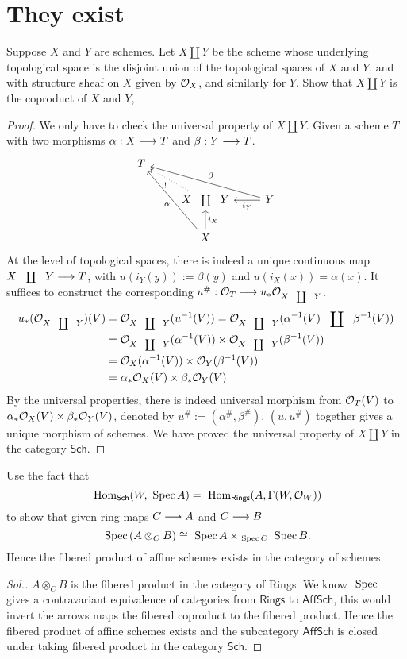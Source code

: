 \documentclass[11pt]{book} %
\begin{document}
\section{They exist}
\begin{exr}
Suppose $X$ and $Y$ are schemes. Let $X\coprod Y$ be the scheme whose underlying topological space is the disjoint union of the topological spaces of $X$ and $Y$, and with structure sheaf on $X$ given by ${\cal O}_X$, and similarly for $Y$. Show that $X\coprod Y$ is the coproduct of $X$ and $Y$,
\end{exr}
\begin{proof}
We only have to check the universal property of $X\coprod Y$.
 Given a scheme $T$ with two morphisms $\alpha: X\longrightarrow T$ and $\beta: Y\longrightarrow T$.
 $$
\begin{tikzcd}
T &  &  \\
 & X\coprod Y \arrow[lu, "!", dotted] & Y \arrow[l, "i_Y"] \arrow[llu, "\beta"'] \\
 & X \arrow[u, "i_X"'] \arrow[luu, "\alpha"] & 
\end{tikzcd}
 $$
 At the level of topological spaces, there is indeed a unique continuous map $X\coprod Y\lrta T$, with $u(i_Y(y)):=\beta(y)$ and $u(i_X(x))=\alpha(x)$. It suffices to construct the corresponding $u^\#:\calo_T\lrta u_*\calo_{X\coprod Y}$. 
 $$
 \begin{aligned}
 u_*(\calo_{X\coprod Y})(V)
 &=\calo_{X\coprod Y}(u^{-1}(V))=\calo_{X\coprod Y}(\alpha^{-1}(V)\coprod\beta^{-1}(V))\\
 &=\calo_{X\coprod Y}(\alpha^{-1}(V))\times\calo_{X\coprod Y}(\beta^{-1}(V))\\
 &=\calo_X(\alpha^{-1}(V))\times\calo_Y(\beta^{-1}(V))\\
 &=\alpha_*\calo_{X}(V)\times \beta_*\calo_{Y}(V) 
 \end{aligned}
 $$  
 By the universal properties, there is indeed universal morphism from ${\cal O}_T(V)$ to $\alpha_*{\cal O}_{X}(V)\times \beta_*{\cal O}_{Y}(V)$, denoted by $u^\#:=(\alpha^\#,\beta^\#)$. $(u,u^\#)$ together gives a unique morphism of schemes.
We have proved the universal property of $X\coprod Y$ in the category $\mathsf{Sch}$.
\end{proof}
\begin{exr}
Use the fact that
$$
\text{ Hom}_{\mathsf{Sch}}(W,\text{ Spec\,} A)=\text{ Hom}_{\mathsf{Rings}}(A,\Gamma(W,{\cal O}_W)) 
$$
to show that given ring maps $C\longrightarrow A$ and $C\longrightarrow B$
$$
\text{ Spec\,} (A\otimes_C B)\cong \text{ Spec\,} A\times_{\text{ Spec\,} C}\text{ Spec\,} B.
$$
Hence the fibered product of affine schemes exists in the category of schemes.
\end{exr}
\begin{proof}[Sol.]
$A\otimes_C B$ is the fibered product in the category of Rings. We know $\text{ Spec\,}$ gives a contravariant equivalence of categories from $\mathsf{Rings}$ to $\mathsf{AffSch}$, this would invert the arrows maps the fibered coproduct to the fibered product.
Hence the fibered product of affine schemes exists and the subcategory $\mathsf{AffSch}$ is closed under taking fibered product in the category $\mathsf{Sch}$.
\end{proof}
\end{document}
